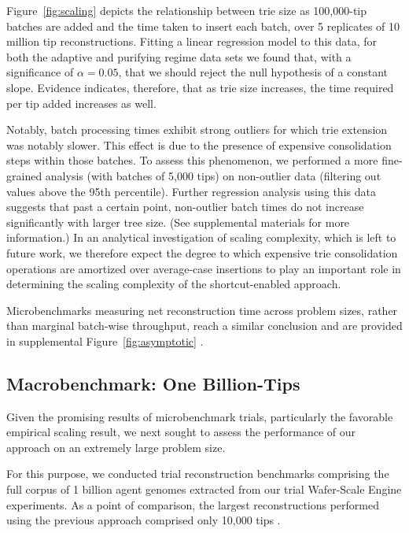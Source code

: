 Figure~\ref{fig:scaling} depicts the relationship between trie size as 100,000-tip batches are added and the time taken to insert each batch, over 5 replicates of 10 million tip reconstructions.
Fitting a linear regression model to this data, for both the adaptive and purifying regime data sets we found that, with a significance of $\alpha = 0.05$, that we should reject the null hypothesis of a constant slope.
Evidence indicates, therefore, that as trie size increases, the time required per tip added increases as well.

Notably, batch processing times exhibit strong outliers for which trie extension was notably slower.
This effect is due to the presence of expensive consolidation steps within those batches.
To assess this phenomenon, we performed a more fine-grained analysis (with batches of 5,000 tips) on non-outlier data (filtering out values above the 95th percentile).
Further regression analysis using this data suggests that past a certain point, non-outlier batch times do not increase significantly with larger tree size.
(See supplemental materials \citep{supplemental} for more information.)
In an analytical investigation of scaling complexity, which is left to future work, we therefore expect the degree to which expensive trie consolidation operations are amortized over average-case insertions to play an important role in determining the scaling complexity of the shortcut-enabled approach.

Microbenchmarks measuring net reconstruction time across problem sizes, rather than marginal batch-wise throughput, reach a similar conclusion and are provided in supplemental Figure~\ref{fig:asymptotic} \citep{supplemental}.

\subsection{Macrobenchmark: One Billion-Tips}



Given the promising results of microbenchmark trials, particularly the favorable empirical scaling result, we next sought to assess the performance of our approach on an extremely large problem size.

For this purpose, we conducted trial reconstruction benchmarks comprising the full corpus of 1 billion agent genomes extracted from our trial Wafer-Scale Engine experiments.
As a point of comparison, the largest reconstructions performed using the previous approach comprised only 10,000 tips \citep{moreno2024trackable}.

